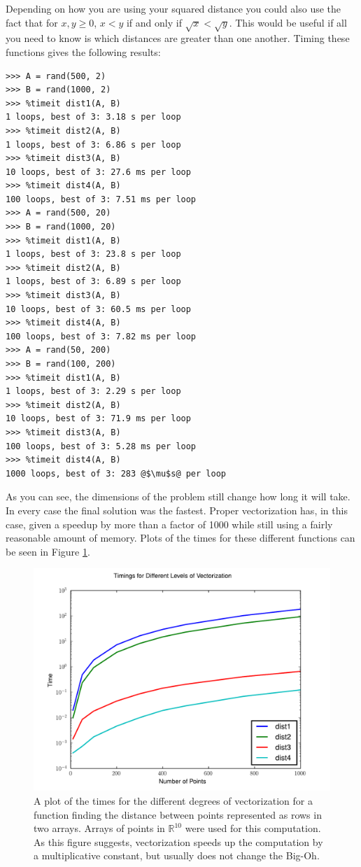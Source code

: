Depending on how you are using your squared distance you could also use the fact that for $x, y \geq 0$, $x < y$ if and only if $\sqrt{x} < \sqrt{y}$.
This would be useful if all you need to know is which distances are greater than one another.
Timing these functions gives the following results:
\begin{lstlisting}[escapechar=\@]
>>> A = rand(500, 2)
>>> B = rand(1000, 2)
>>> %timeit dist1(A, B)
1 loops, best of 3: 3.18 s per loop
>>> %timeit dist2(A, B)
1 loops, best of 3: 6.86 s per loop
>>> %timeit dist3(A, B)
10 loops, best of 3: 27.6 ms per loop
>>> %timeit dist4(A, B)
100 loops, best of 3: 7.51 ms per loop
>>> A = rand(500, 20)
>>> B = rand(1000, 20)
>>> %timeit dist1(A, B)
1 loops, best of 3: 23.8 s per loop
>>> %timeit dist2(A, B)
1 loops, best of 3: 6.89 s per loop
>>> %timeit dist3(A, B)
10 loops, best of 3: 60.5 ms per loop
>>> %timeit dist4(A, B)
100 loops, best of 3: 7.82 ms per loop
>>> A = rand(50, 200)
>>> B = rand(100, 200)
>>> %timeit dist1(A, B)
1 loops, best of 3: 2.29 s per loop
>>> %timeit dist2(A, B)
10 loops, best of 3: 71.9 ms per loop
>>> %timeit dist3(A, B)
100 loops, best of 3: 5.28 ms per loop
>>> %timeit dist4(A, B)
1000 loops, best of 3: 283 @$\mu$s@ per loop
\end{lstlisting}
As you can see, the dimensions of the problem still change how long it will take.
In every case the final solution was the fastest.
Proper vectorization has, in this case, given a speedup by more than a factor of 1000 while still using a fairly reasonable amount of memory.
Plots of the times for these different functions can be seen in Figure \ref{distplot}.

\begin{figure}
\includegraphics[width=\textwidth]{distplot.pdf}
\caption{A plot of the times for the different degrees of vectorization for a function finding the distance between points represented as rows in two arrays. Arrays of points in $\mathbb{R}^{10}$ were used for this computation. As this figure suggests, vectorization speeds up the computation
by a multiplicative constant, but usually does not change the Big-Oh.}
\label{distplot}
\end{figure}

